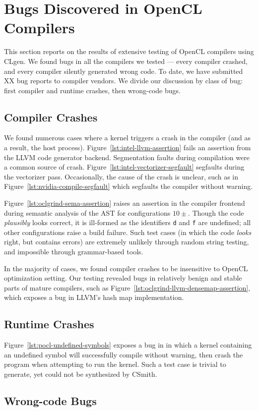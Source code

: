 \section{Bugs Discovered in OpenCL Compilers}

This section reports on the results of extensive testing of OpenCL compilers using CLgen. We found bugs in all the compilers we tested --- every compiler crashed, and every compiler silently generated wrong code. To date, we have submitted XX bug reports to compiler vendors. We divide our discussion by class of bug: first compiler and runtime crashes, then wrong-code bugs.

\subsection{Compiler Crashes}

We found numerous cases where a kernel triggers a crash in the compiler (and as a result, the host process). Figure~\ref{lst:intel-llvm-assertion} fails an assertion from the LLVM code generator backend. Segmentation faults during compilation were a common source of crash. Figure~\ref{lst:intel-vectorizer-segfault} segfaults during the vectorizer pass. Occasionally, the cause of the crash is unclear, such as in Figure~\ref{lst:nvidia-compile-segfault} which segfaults the compiler without warning.

Figure~\ref{lst:oclgrind-sema-assertion} raises an assertion in the compiler frontend during semantic analysis of the AST for configurations $10\pm$. Though the code \emph{plausibly} looks correct, it is ill-formed as the identifiers \texttt{d} and \texttt{f} are undefined; all other configurations raise a build failure. Such test cases (in which the code \emph{looks} right, but contains errors) are extremely unlikely through random string testing, and impossible through grammar-based tools.

In the majority of cases, we found compiler crashes to be insensitive to OpenCL optimization setting. Our testing revealed bugs in relatively benign and stable parts of mature compilers, such as Figure~\ref{lst:oclgrind-llvm-densemap-assertion}, which exposes a bug in LLVM's hash map implementation.



\subsection{Runtime Crashes}

Figure~\ref{lst:pocl-undefined-symbols} exposes a bug in in which a kernel containing an undefined symbol will successfully compile without warning, then crash the program when attempting to run the kernel. Such a test case is trivial to generate, yet could not be synthesized by CSmith.



\subsection{Wrong-code Bugs}

